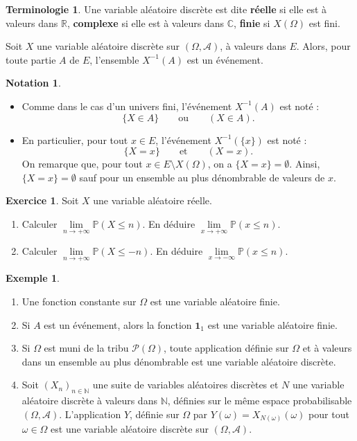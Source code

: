 \documentclass[french]{article}
\renewcommand{\P}{\mathbb{P}}
\newcommand{\N}{\mathbb{N}}
\newcommand{\R}{\mathbb{R}}
\newcommand{\C}{\mathbb{C}}
\newcommand{\inv}{^{-1}}
\theoremstyle{plain}
\theoremstyle{definition}
\newtheorem*{ex}{Exemple}
\newtheorem{exo}{Exercice}
\newtheorem*{notation}{Notation}
\newtheorem*{terminologie}{Terminologie}
\theoremstyle{remark}
\begin{document}
\begin{terminologie}
	Une variable aléatoire discrète est dite \textbf{réelle} si elle est à valeurs dans $\R$, \textbf{complexe} si elle est à valeurs dans $\C$, \textbf{finie} si $X(\Omega)$ est fini.
\end{terminologie}

\begin{thm}{}%
	Soit $X$ une variable aléatoire discrète sur $(\Omega,\mathcal{A})$, à valeurs dans $E$. Alors, pour toute partie $A$ de $E$, l'ensemble $X\inv(A)$ est un événement.
\end{thm}

\begin{notation}
	\begin{itemize}
		\item Comme dans le cas d'un univers fini, l'événement $X\inv(A)$ est noté :
		$$\{X\in A\}\quad\quad\text{ou}\quad\quad (X\in A).$$
		\item En particulier, pour tout $x\in E$, l'événement $X\inv(\{x\})$ est noté :
		$$\{X=x\}\quad\quad\text{et}\quad\quad(X=x).$$
		On remarque que, pour tout $x\in E\setminus X(\Omega)$, on a $\{X=x\}=\emptyset$. Ainsi, $\{X=x\}=\emptyset$ sauf pour un ensemble au plus dénombrable de valeurs de $x$.
	\end{itemize}
\end{notation}

\begin{exo}
	Soit $X$ une variable aléatoire réelle.
	\begin{enumerate}
		\item Calculer $\underset{n\to+\infty}{\lim}\P(X\leqslant n)$. En déduire $\underset{x\to+\infty}{\lim}\P(x\leqslant n)$.
		\item Calculer $\underset{n\to+\infty}{\lim}\P(X\leqslant -n)$. En déduire $\underset{x\to-\infty}{\lim}\P(x\leqslant n)$.
	\end{enumerate}
\end{exo}

\begin{ex}
	\begin{enumerate}
		\item Une fonction constante sur $\Omega$ est une variable aléatoire finie.
		\item Si $A$ est un événement, alors la fonction $\textbf{1}_1$ est une variable aléatoire finie.
		\item Si $\Omega$ est muni de la tribu $\mathcal{P}(\Omega)$, toute application définie sur $\Omega$ et à valeurs dans un ensemble au plus dénombrable est une variable aléatoire discrète.
		\item Soit $(X_n)_{n\in\N}$ une suite de variables aléatoires discrètes et $N$ une variable aléatoire discrète à valeurs dans $\N$, définies sur le même espace probabilisable $(\Omega,\mathcal{A})$. L'application $Y$, définie sur $\Omega$ par $Y(\omega)=X_{N(\omega)}(\omega)$ pour tout $\omega\in\Omega$ est une variable aléatoire discrète sur $(\Omega,\mathcal{A})$.
	\end{enumerate}
\end{ex}
\end{document}
